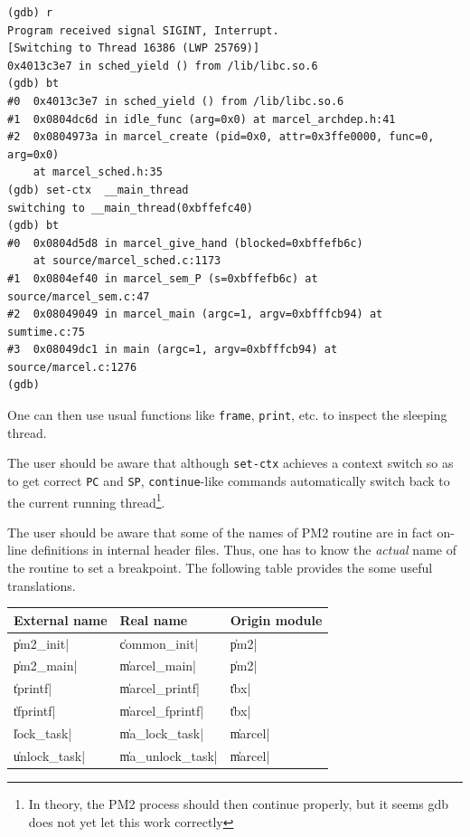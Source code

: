 \begin{verbatim}
(gdb) r
Program received signal SIGINT, Interrupt.
[Switching to Thread 16386 (LWP 25769)]
0x4013c3e7 in sched_yield () from /lib/libc.so.6
(gdb) bt
#0  0x4013c3e7 in sched_yield () from /lib/libc.so.6
#1  0x0804dc6d in idle_func (arg=0x0) at marcel_archdep.h:41
#2  0x0804973a in marcel_create (pid=0x0, attr=0x3ffe0000, func=0, arg=0x0)
    at marcel_sched.h:35
(gdb) set-ctx  __main_thread
switching to __main_thread(0xbffefc40)
(gdb) bt
#0  0x0804d5d8 in marcel_give_hand (blocked=0xbffefb6c)
    at source/marcel_sched.c:1173
#1  0x0804ef40 in marcel_sem_P (s=0xbffefb6c) at source/marcel_sem.c:47
#2  0x08049049 in marcel_main (argc=1, argv=0xbfffcb94) at sumtime.c:75
#3  0x08049dc1 in main (argc=1, argv=0xbfffcb94) at source/marcel.c:1276
(gdb)
\end{verbatim}

One can then use usual functions like \texttt{frame}, \texttt{print},
etc. to inspect the sleeping thread.

The user should be aware that although \texttt{set-ctx} achieves a
context switch so as to get correct \texttt{PC} and \texttt{SP},
\texttt{continue}-like commands automatically switch back to the
current running thread\footnote{In theory, the PM2 process should
then continue properly, but it seems gdb does not yet let this work
correctly}.

The user should be aware that some of the names of PM2 routine are in
fact on-line definitions in internal header files. Thus, one has to
know the \emph{actual} name of the routine to set a breakpoint. The
following table provides the some useful translations.
\begin{center}
\begin{tabular}{|l|l|l|}
\hline
External name & Real name & Origin module \\
\hline
\|pm2_init|     & \|common_init|        & \|pm2| \\
\|pm2_main|     & \|marcel_main|        & \|pm2| \\
\hline
\|tprintf|      & \|marcel_printf|      & \|tbx| \\
\|tfprintf|     & \|marcel_fprintf|     & \|tbx| \\
\hline
\|lock_task|    & \|ma_lock_task|       & \|marcel| \\
\|unlock_task|  & \|ma_unlock_task|     & \|marcel| \\
\hline
\end{tabular}
\end{center}


